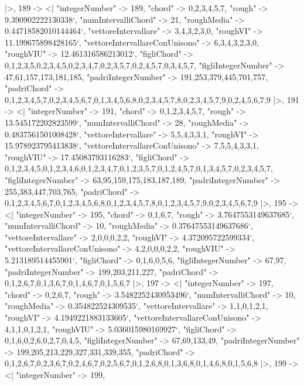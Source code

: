 \documentclass[
]{article}
\begin{document}
\begin{DatasetVerbatim}
  |>,
  189 -> <|
    "integerNumber" -> 189,
    "chord" -> {0,2,3,4,5,7},
    "rough" -> 9.390902222130338`,
    "numIntervalliChord" -> 21,
    "roughMedia" -> 0.44718582010144464`,
    "vettoreIntervallare" -> {3,4,3,2,3,0},
    "roughVI" -> 11.199675898428165`,
    "vettoreIntervallareConUnisono" -> {6,3,4,3,2,3,0},
    "roughVIU" -> 12.461316586213012`,
    "figliChord" -> {{0,1,2,3,5},{0,2,3,4,5},{0,2,3,4,7},{0,2,3,5,7},{0,2,4,5,7},{0,3,4,5,7}},
    "figliIntegerNumber" -> {47,61,157,173,181,185},
    "padriIntegerNumber" -> {191,253,379,445,701,757},
    "padriChord" -> {{0,1,2,3,4,5,7},{0,2,3,4,5,6,7},{0,1,3,4,5,6,8},{0,2,3,4,5,7,8},{0,2,3,4,5,7,9},{0,2,4,5,6,7,9}}
  |>,
  191 -> <|
    "integerNumber" -> 191,
    "chord" -> {0,1,2,3,4,5,7},
    "rough" -> 13.545172202823599`,
    "numIntervalliChord" -> 28,
    "roughMedia" -> 0.4837561501008428`,
    "vettoreIntervallare" -> {5,5,4,3,3,1},
    "roughVI" -> 15.978923795413838`,
    "vettoreIntervallareConUnisono" -> {7,5,5,4,3,3,1},
    "roughVIU" -> 17.45083793116283`,
    "figliChord" -> {{0,1,2,3,4,5},{0,1,2,3,4,6},{0,1,2,3,4,7},{0,1,2,3,5,7},{0,1,2,4,5,7},{0,1,3,4,5,7},{0,2,3,4,5,7}},
    "figliIntegerNumber" -> {63,95,159,175,183,187,189},
    "padriIntegerNumber" -> {255,383,447,703,765},
    "padriChord" -> {{0,1,2,3,4,5,6,7},{0,1,2,3,4,5,6,8},{0,1,2,3,4,5,7,8},{0,1,2,3,4,5,7,9},{0,2,3,4,5,6,7,9}}
  |>,
  195 -> <|
    "integerNumber" -> 195,
    "chord" -> {0,1,6,7},
    "rough" -> 3.7647553149637685`,
    "numIntervalliChord" -> 10,
    "roughMedia" -> 0.37647553149637686`,
    "vettoreIntervallare" -> {2,0,0,0,2,2},
    "roughVI" -> 4.372095722599334`,
    "vettoreIntervallareConUnisono" -> {4,2,0,0,0,2,2},
    "roughVIU" -> 5.213189514455901`,
    "figliChord" -> {{0,1,6},{0,5,6}},
    "figliIntegerNumber" -> {67,97},
    "padriIntegerNumber" -> {199,203,211,227},
    "padriChord" -> {{0,1,2,6,7},{0,1,3,6,7},{0,1,4,6,7},{0,1,5,6,7}}
  |>,
  197 -> <|
    "integerNumber" -> 197,
    "chord" -> {0,2,6,7},
    "rough" -> 3.5482252430953496`,
    "numIntervalliChord" -> 10,
    "roughMedia" -> 0.354822524309535`,
    "vettoreIntervallare" -> {1,1,0,1,2,1},
    "roughVI" -> 4.1949221883133605`,
    "vettoreIntervallareConUnisono" -> {4,1,1,0,1,2,1},
    "roughVIU" -> 5.036015980169927`,
    "figliChord" -> {{0,1,6},{0,2,6},{0,2,7},{0,4,5}},
    "figliIntegerNumber" -> {67,69,133,49},
    "padriIntegerNumber" -> {199,205,213,229,327,331,339,355},
    "padriChord" -> {{0,1,2,6,7},{0,2,3,6,7},{0,2,4,6,7},{0,2,5,6,7},{0,1,2,6,8},{0,1,3,6,8},{0,1,4,6,8},{0,1,5,6,8}}
  |>,
  199 -> <|
    "integerNumber" -> 199,

\end{DatasetVerbatim}
\end{document}
